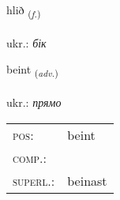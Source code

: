 \documentclass[frontgrid, backgrid]{flacards}\usepackage[]{graphicx}\usepackage[]{xcolor}
\begin{document}
\renewcommand{\flhead}{\vskip5pt \fboxsep=0pt {\small\bfseries\footnotesize Nafnorð | іменник}}
\renewcommand{\fcfoot}{\vskip5pt \fboxsep=0pt \hspace{2pt}{\small\bfseries\footnotesize 1K}}

\renewcommand{\blhead}{\vskip5pt {\small\bfseries\footnotesize Nafnorð | іменник }}
\renewcommand{\bcfoot}{\vskip5pt \hspace{2pt}{\small\bfseries\footnotesize 1K}}


{hlið \small{\textsubscript{(\textit{f.})}} \\[1ex] %
\textphonetic{[l̥ɪːð]} \\
ukr.: \emph{бік} \\  [2ex]
\renewcommand*{\arraystretch}{0.8}
}

\renewcommand{\flhead}{\vskip5pt \fboxsep=0pt {\small\bfseries\footnotesize Atviksorð | прислівник}}
\renewcommand{\fcfoot}{\vskip5pt \fboxsep=0pt \hspace{2pt}{\small\bfseries\footnotesize 1K}}

\renewcommand{\blhead}{\vskip5pt {\small\bfseries\footnotesize Atviksorð | прислівник }}
\renewcommand{\bcfoot}{\vskip5pt \hspace{2pt}{\small\bfseries\footnotesize 1K}}


{beint \small{\textsubscript{(\textit{adv.})}} \\[1ex] %
\textphonetic{[pein̥t]} \\
ukr.: \emph{прямо} \\  [2ex]
\renewcommand*{\arraystretch}{0.8}
\begin{tabular}{ll}
\textsc{pos}: & beint \\ 
\textsc{comp.}: &  \\ 
\textsc{superl.}: & beinast \\
\end{tabular}
}
\end{document}
